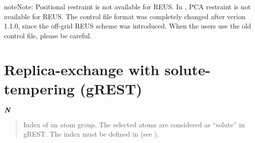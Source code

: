 \documentclass[a4paper,11pt,oneside,english]{sphinxmanual}
\begin{document}
\begin{sphinxadmonition}{note}{Note:}
Positional restraint is not available for REUS.
In , PCA restraint is not available for REUS.
The control file format was completely changed after verion 1.1.0,
since the off-grid REUS scheme was introduced.
When the users use the old control file, please be careful.
\end{sphinxadmonition}


\section{Replica-exchange with solute-tempering (gREST)}
\label{\detokenize{14_REMD:replica-exchange-with-solute-tempering-grest}}
\(\textbf{\textit{N}}\) 
\begin{quote}


Index of an atom group. The selected atoms are considered as “solute” in gREST.
The index must be defined in \sphinxstylestrong{{[}SELECTION{]}} (see {\hyperref[\detokenize{11_Selection:selection}]{}}).
\end{quote}
\end{document}
